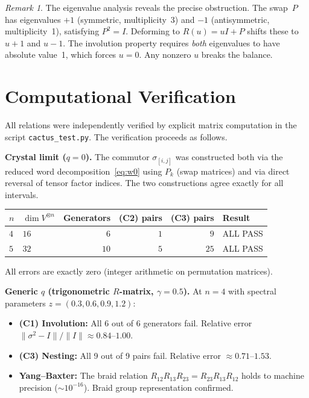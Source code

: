 \documentclass[11pt]{article}
\theoremstyle{remark}
\newtheorem{remark}[theorem]{Remark}
\begin{document}
\begin{remark}
The eigenvalue analysis reveals the precise obstruction. The swap~$P$ has
eigenvalues $+1$ (symmetric, multiplicity~3) and $-1$ (antisymmetric,
multiplicity~1), satisfying $P^2 = I$. Deforming to $R(u) = uI + P$
shifts these to $u + 1$ and $u - 1$. The involution property requires
\emph{both} eigenvalues to have absolute value~1, which forces $u = 0$.
Any nonzero $u$ breaks the balance.
\end{remark}

\section{Computational Verification}

All relations were independently verified by explicit matrix computation
in the script \texttt{cactus\_test.py}. The verification proceeds as follows.

\textbf{Crystal limit ($q = 0$).}
The commutor $\sigma_{[i,j]}$ was constructed both via the reduced word
decomposition~\eqref{eq:w0} using $P_k$ (swap matrices) and via direct
reversal of tensor factor indices. The two constructions agree exactly for
all intervals.

\begin{center}
\begin{tabular}{@{}llrrrl@{}}
  \toprule
  $n$ & $\dim V^{\otimes n}$ & Generators & (C2) pairs & (C3) pairs & Result \\
  \midrule
  $4$ & $16$ & $6$ & $1$ & $9$ & ALL PASS \\
  $5$ & $32$ & $10$ & $5$ & $25$ & ALL PASS \\
  \bottomrule
\end{tabular}
\end{center}

\noindent
All errors are exactly zero (integer arithmetic on permutation matrices).

\textbf{Generic $q$ (trigonometric $R$-matrix, $\gamma = 0.5$).}
At $n = 4$ with spectral parameters $z = (0.3, 0.6, 0.9, 1.2)$:

\begin{itemize}
  \item \textbf{(C1) Involution:} All 6 out of 6 generators fail.
    Relative error $\|\sigma^2 - I\|/\|I\| \approx 0.84\text{--}1.00$.
  \item \textbf{(C3) Nesting:} All 9 out of 9 pairs fail.
    Relative error $\approx 0.71\text{--}1.53$.
  \item \textbf{Yang--Baxter:} The braid relation
    $R_{12}R_{13}R_{23} = R_{23}R_{13}R_{12}$ holds to machine precision
    ($\sim 10^{-16}$). Braid group representation confirmed.
\end{itemize}
\end{document}
